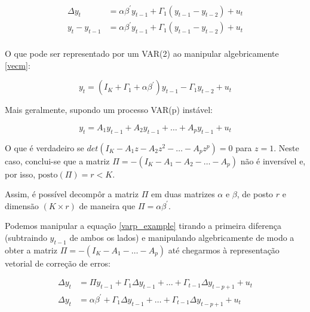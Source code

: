 \documentclass[a4paper,
               article,
               12pt,
               openany,
               oneside,
               english,
               brazil]{abntex2}
\numberwithin{equation}{section}
\begin{document}
    \begin{equation}
        \label{vecm}
        \begin{aligned}
            \Delta y_t &= \alpha \beta^{'} y_{t-1} + \Gamma_1(y_{t-1} - y_{t-2}) + u_t \\
            y_t - y_{t-1} &= \alpha \beta^{'} y_{t-1} + \Gamma_1(y_{t-1} - y_{t-2}) + u_t \\
        \end{aligned}
    \end{equation}

    O que pode ser representado por um VAR(2) ao manipular algebricamente \eqref{vecm}:

    \begin{equation}
        \label{vecm-var}
        y_t = (I_K + \Gamma_1 + \alpha \beta^{'})y_{t-1} - \Gamma_1 y_{t-2} + u_t
    \end{equation}

    Mais geralmente, supondo um processo VAR(p) instável:
    
    \begin{equation}
        \label{varp_example}
        y_t = A_1 y_{t-1} + A_2 y_{t-1} + \dots + A_p y_{t-1} + u_t 
    \end{equation}

    O que é verdadeiro se $ det(I_K - A_1z - A_2z^2 - \dots - A_pz^p) = 0 $ para $ z = 1 $. Neste caso, conclui-se que a matriz $ \Pi = -(I_K - A_1 - A_2 - \dots - A_p) $ não é inversível e, por isso, $ \text{posto}(\Pi) = r < K $.
    
    Assim, é possível decompôr a matriz $ \Pi $ em duas matrizes $ \alpha $ e $ \beta $, de posto $ r $ e dimensão $ (K \times r) $ de maneira que $ \Pi = \alpha \beta^{'} $.

   Podemos manipular a equação \eqref{varp_example} tirando a primeira diferença (subtraindo $ y_{t-1} $ de ambos os lados) e manipulando algebricamente de modo a obter a matriz $ \Pi = -(I_K - A_1 - \dots - A_p) $ até chegarmos à representação vetorial de correção de erros:

   \begin{equation}
       \label{vecm_coint}
       \begin{aligned}
           \Delta y_t &= \Pi y_{t-1} + \Gamma_1 \Delta y_{t-1} + \dots + \Gamma_{t-1} \Delta y_{t-p+1} + u_t \\
           \Delta y_t &= \alpha \beta^{'} + \Gamma_1 \Delta y_{t-1} + \dots + \Gamma_{t-1} \Delta y_{t-p+1} + u_t
       \end{aligned}
   \end{equation}
\end{document}
